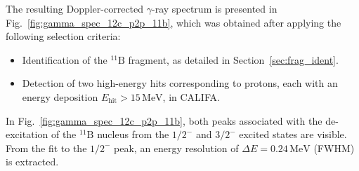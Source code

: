 The resulting Doppler-corrected $\gamma$-ray spectrum is presented in Fig.~\ref{fig:gamma_spec_12c_p2p_11b}, which was obtained after applying the following selection criteria:
\begin{itemize}
  \item Identification of the $^{11}\mathrm{B}$ fragment, as detailed in Section~\ref{sec:frag_ident}.
  \item Detection of two high-energy hits corresponding to protons, each with an energy deposition $E_{\text{hit}} > 15\,\mathrm{MeV}$, in CALIFA.
\end{itemize}
In Fig.~\ref{fig:gamma_spec_12c_p2p_11b}, both peaks associated with the de-excitation of the $^{11}\mathrm{B}$ nucleus from the $1/2^-$ and $3/2^-$ excited states are visible. From the fit to the $1/2^-$ peak, an energy resolution of $\Delta E = 0.24\,\mathrm{MeV}$ (FWHM) is extracted.

